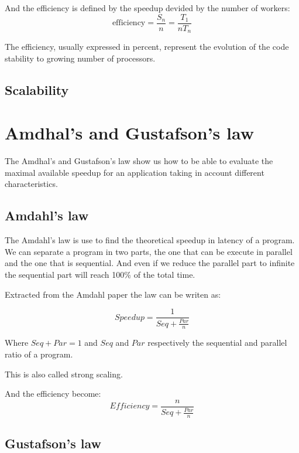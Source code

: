And the efficiency is defined by the speedup devided by the number of workers: 
\begin{equation}
\text{efficiency} = \frac{S_n}{n} = \frac{T_1}{nT_n}
\end{equation}

The efficiency, usually expressed in percent, represent the evolution of the code stability to growing number of processors. 


\subsection{Scalability}

\section{Amdhal's and Gustafson's law}

The Amdhal's and Gustafson's law show us how to be able to evaluate the maximal available speedup for an application taking in account different characteristics. 

\subsection{Amdahl's law}

The Amdahl's law\cite{amdahl1967validity} is use to find the theoretical speedup in latency of a program.
We can separate a program in two parts, the one that can be execute in parallel and the one that is sequential. 
And even if we reduce the parallel part to infinite the sequential part will reach 100\% of the total time. 

Extracted from the Amdahl paper the law can be writen as: 

\begin{equation}
Speedup = \frac{1}{Seq + \frac{Par}{n}}
\end{equation}

Where $Seq + Par = 1$ and $Seq$ and $Par$ respectively the sequential and parallel ratio of a program.

This is also called strong scaling.  

And the efficiency become:
\begin{equation}
Efficiency = \frac{n}{Seq + \frac{Par}{n}}
\end{equation}

\subsection{Gustafson's law}

